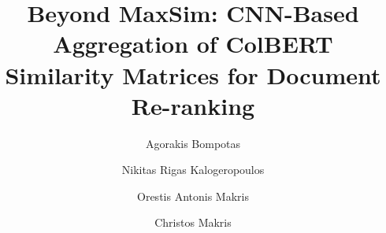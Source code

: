 \documentclass[preprint,5p,times,twocolumn,authoryear]{elsarticle}
\begin{document}
\begin{frontmatter}



\title{Beyond MaxSim: CNN-Based Aggregation of ColBERT Similarity Matrices for Document Re-ranking} %


\author[ceid]{Agorakis Bompotas} %

\author[ceid]{Nikitas Rigas Kalogeropoulos} %

\author[ceid]{Orestis Antonis Makris} %

\author[ceid]{Christos Makris} %



\end{frontmatter}
\end{document}
